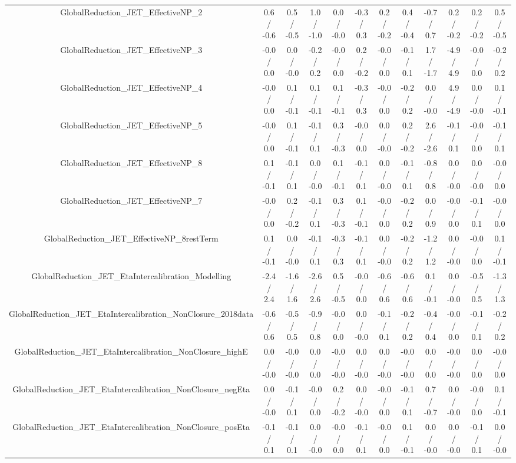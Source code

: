 \begin{table}[htbp]
\begin{center}
\begin{tabular}{|c|c|c|c|c|c|c|c|c|c|c|c|}
  GlobalReduction_JET_EffectiveNP_2 & 0.6 / -0.6 & 0.5 / -0.5 & 1.0 / -1.0 & 0.0 / -0.0 & -0.3 / 0.3 & 0.2 / -0.2 & 0.4 / -0.4 & -0.7 / 0.7 & 0.2 / -0.2 & 0.2 / -0.2 & 0.5 / -0.5 \\ 
  GlobalReduction_JET_EffectiveNP_3 & -0.0 / 0.0 & 0.0 / -0.0 & -0.2 / 0.2 & -0.0 / 0.0 & 0.2 / -0.2 & -0.0 / 0.0 & -0.1 / 0.1 & 1.7 / -1.7 & -4.9 / 4.9 & -0.0 / 0.0 & -0.2 / 0.2 \\ 
  GlobalReduction_JET_EffectiveNP_4 & -0.0 / 0.0 & 0.1 / -0.1 & 0.1 / -0.1 & 0.1 / -0.1 & -0.3 / 0.3 & -0.0 / 0.0 & -0.2 / 0.2 & 0.0 / -0.0 & 4.9 / -4.9 & 0.0 / -0.0 & 0.1 / -0.1 \\ 
  GlobalReduction_JET_EffectiveNP_5 & -0.0 / 0.0 & 0.1 / -0.1 & -0.1 / 0.1 & 0.3 / -0.3 & -0.0 / 0.0 & 0.0 / -0.0 & 0.2 / -0.2 & 2.6 / -2.6 & -0.1 / 0.1 & -0.0 / 0.0 & -0.1 / 0.1 \\ 
  GlobalReduction_JET_EffectiveNP_8 & 0.1 / -0.1 & -0.1 / 0.1 & 0.0 / -0.0 & 0.1 / -0.1 & -0.1 / 0.1 & 0.0 / -0.0 & -0.1 / 0.1 & -0.8 / 0.8 & 0.0 / -0.0 & 0.0 / -0.0 & -0.0 / 0.0 \\ 
  GlobalReduction_JET_EffectiveNP_7 & -0.0 / 0.0 & 0.2 / -0.2 & -0.1 / 0.1 & 0.3 / -0.3 & 0.1 / -0.1 & -0.0 / 0.0 & -0.2 / 0.2 & 0.0 / 0.9 & -0.0 / 0.0 & -0.1 / 0.1 & -0.0 / 0.0 \\ 
  GlobalReduction_JET_EffectiveNP_8restTerm & 0.1 / -0.1 & 0.0 / -0.0 & -0.1 / 0.1 & -0.3 / 0.3 & -0.1 / 0.1 & 0.0 / -0.0 & -0.2 / 0.2 & -1.2 / 1.2 & 0.0 / -0.0 & -0.0 / 0.0 & 0.1 / -0.1 \\ 
  GlobalReduction_JET_EtaIntercalibration_Modelling & -2.4 / 2.4 & -1.6 / 1.6 & -2.6 / 2.6 & 0.5 / -0.5 & -0.0 / 0.0 & -0.6 / 0.6 & -0.6 / 0.6 & 0.1 / -0.1 & 0.0 / -0.0 & -0.5 / 0.5 & -1.3 / 1.3 \\ 
  GlobalReduction_JET_EtaIntercalibration_NonClosure_2018data & -0.6 / 0.6 & -0.5 / 0.5 & -0.9 / 0.8 & -0.0 / 0.0 & 0.0 / -0.0 & -0.1 / 0.1 & -0.2 / 0.2 & -0.4 / 0.4 & -0.0 / 0.0 & -0.1 / 0.1 & -0.2 / 0.2 \\ 
  GlobalReduction_JET_EtaIntercalibration_NonClosure_highE & 0.0 / -0.0 & -0.0 / -0.0 & 0.0 / 0.0 & -0.0 / -0.0 & 0.0 / -0.0 & 0.0 / -0.0 & -0.0 / -0.0 & 0.0 / 0.0 & -0.0 / -0.0 & 0.0 / 0.0 & -0.0 / 0.0 \\ 
  GlobalReduction_JET_EtaIntercalibration_NonClosure_negEta & 0.0 / -0.0 & -0.1 / 0.1 & -0.0 / 0.0 & 0.2 / -0.2 & 0.0 / -0.0 & -0.0 / 0.0 & -0.1 / 0.1 & 0.7 / -0.7 & 0.0 / -0.0 & -0.0 / 0.0 & 0.1 / -0.1 \\ 
  GlobalReduction_JET_EtaIntercalibration_NonClosure_posEta & -0.1 / 0.1 & -0.1 / 0.1 & 0.0 / -0.0 & -0.0 / 0.0 & -0.1 / 0.1 & -0.0 / 0.0 & 0.1 / -0.1 & 0.0 / -0.0 & 0.0 / -0.0 & -0.1 / 0.1 & 0.0 / -0.0 \\ 

\end{tabular}
\end{center}
\end{table}
